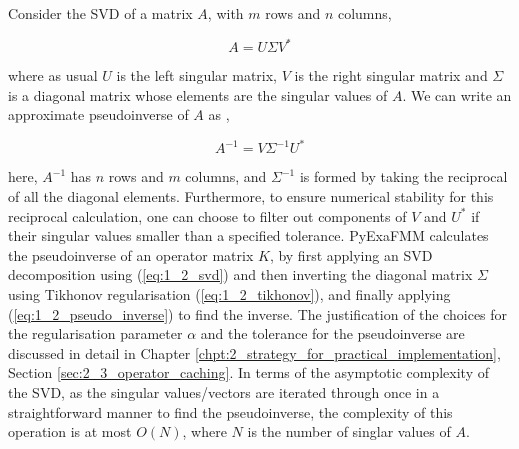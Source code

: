 Consider the SVD of a matrix $A$, with $m$ rows and $n$ columns,

\begin{equation}
    A = U \Sigma V^*
    \label{eq:1_2_svd}
\end{equation}

where as usual $U$ is the left singular matrix, $V$ is the right singular matrix
and $\Sigma$ is a diagonal matrix whose elements are the singular values of $A$.
We can write an approximate pseudoinverse of $A$ as \cite{Trefethen:1997:SIAM},

\begin{equation}
    A^{-1} = V \Sigma^{-1} U^*
    \label{eq:1_2_pseudo_inverse}
\end{equation}

here, $A^{-1}$ has $n$ rows and $m$ columns, and $\Sigma^{-1}$ is formed
by taking the reciprocal of all the diagonal elements. Furthermore, to ensure
numerical stability for this reciprocal calculation, one can choose to filter
out components of $V$ and $U^*$ if their singular values smaller than a specified
tolerance. \gls{PyExaFMM} calculates the pseudoinverse of an operator matrix $K$,
by first applying an \gls{SVD} decomposition using (\ref{eq:1_2_svd}) and then
inverting the diagonal matrix $\Sigma$ using Tikhonov regularisation
(\ref{eq:1_2_tikhonov}), and finally applying (\ref{eq:1_2_pseudo_inverse}) to find
the inverse. The justification of the choices for the regularisation parameter
$\alpha$ and the tolerance for the pseudoinverse are discussed in detail in
Chapter \ref{chpt:2_strategy_for_practical_implementation},
Section \ref{sec:2_3_operator_caching}. In terms of the asymptotic complexity of the \gls{SVD},
as the singular values/vectors are iterated through once in a straightforward
manner to find the pseudoinverse, the complexity of this operation is at most $O(N)$,
where $N$ is the number of singlar values of $A$.

